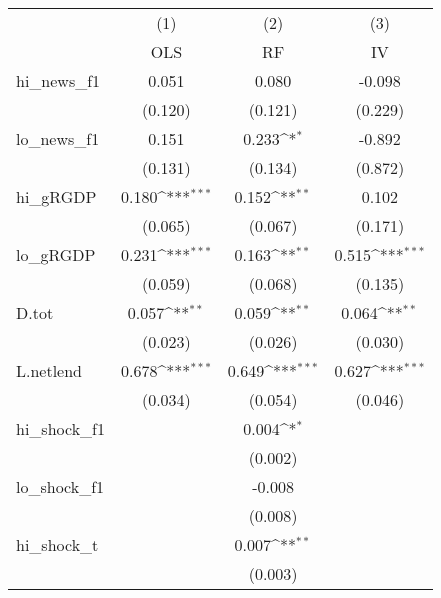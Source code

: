 {
\def\sym#1{\ifmmode^{#1}\else\(^{#1}\)\fi}
\begin{tabular}{l*{3}{c}}
\toprule
            &\multicolumn{1}{c}{(1)}&\multicolumn{1}{c}{(2)}&\multicolumn{1}{c}{(3)}\\
            &\multicolumn{1}{c}{OLS}&\multicolumn{1}{c}{RF}&\multicolumn{1}{c}{IV}\\
\midrule
hi\_news\_f1  &       0.051         &       0.080         &      -0.098         \\
            &     (0.120)         &     (0.121)         &     (0.229)         \\
\addlinespace
lo\_news\_f1  &       0.151         &       0.233\sym{*}  &      -0.892         \\
            &     (0.131)         &     (0.134)         &     (0.872)         \\
\addlinespace
hi\_gRGDP    &       0.180\sym{***}&       0.152\sym{**} &       0.102         \\
            &     (0.065)         &     (0.067)         &     (0.171)         \\
\addlinespace
lo\_gRGDP    &       0.231\sym{***}&       0.163\sym{**} &       0.515\sym{***}\\
            &     (0.059)         &     (0.068)         &     (0.135)         \\
\addlinespace
D.tot       &       0.057\sym{**} &       0.059\sym{**} &       0.064\sym{**} \\
            &     (0.023)         &     (0.026)         &     (0.030)         \\
\addlinespace
L.netlend   &       0.678\sym{***}&       0.649\sym{***}&       0.627\sym{***}\\
            &     (0.034)         &     (0.054)         &     (0.046)         \\
\addlinespace
hi\_shock\_f1 &                     &       0.004\sym{*}  &                     \\
            &                     &     (0.002)         &                     \\
\addlinespace
lo\_shock\_f1 &                     &      -0.008         &                     \\
            &                     &     (0.008)         &                     \\
\addlinespace
hi\_shock\_t  &                     &       0.007\sym{**} &                     \\
            &                     &     (0.003)         &                     \\

\end{tabular}}
